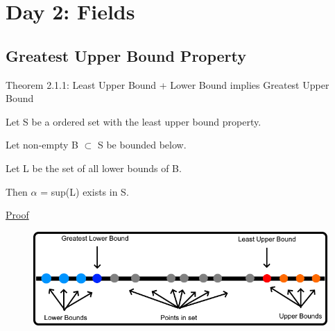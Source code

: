 \newpage
\section[Day 2: Fields and Order]{Day 2: Fields}





\subsection{Greatest Upper Bound Property}

{ \color{red} Theorem 2.1.1:
Least Upper Bound + Lower Bound implies Greatest Upper Bound }

	\begin{adjustbox}{minipage=14cm, right}
		Let S be a ordered set with the least upper bound property.

		Let non-empty B $\subset$ S be bounded below.

		Let L be the set of all lower bounds of B.

		Then $\alpha$ = sup(L) exists in S.
	\end{adjustbox}

{ \color{magenta} \underline{Proof} }


\begin{figure}[h]
	\centering
	\includegraphics[scale=0.45]{Images/2.1.png}
\end{figure}





